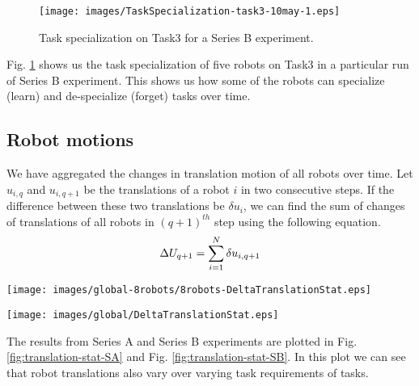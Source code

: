 \begin{figure}
\centering
\texttt{[image: images/TaskSpecialization-task3-10may-1.eps]}
\caption{Task specialization on Task3 for a Series B experiment.}
\label{fig:k-single-task-SB} 
\end{figure}
Fig. \ref{fig:k-single-task-SB} shows us the task specialization of five robots on Task3 in a particular run of Series B experiment. This shows us how some of the robots can specialize (learn) and de-specialize (forget) tasks over time.
\subsection*{Robot motions}
We have aggregated the changes in translation motion of all robots over time. Let $u_{i,q}$ and $u_{i,q+1}$ be the translations of a robot $i$ in two consecutive steps. If the difference between these two translations be $\delta u_{i}$, we can find the sum of changes of translations of all robots in $(q+1)^{th}$ step using the following equation.
\begin{equation}
\small 
\Delta U_{q+1} = \sum_{i=1}^{N} \delta u_{i, q+1} 
\label{eqn:Delta-Tr}
\end{equation}
\begin{figure*}
\centering
\texttt{[image: images/global-8robots/8robots-DeltaTranslationStat.eps]}
\caption{\small Sum of the translations of robots in Series A experiments}
\label{fig:translation-stat-SA} %
\centering
\texttt{[image: images/global/DeltaTranslationStat.eps]}
\caption{\small Sum of the translations of robots in Series B experiments}
\label{fig:translation-stat-SB} %
\end{figure*}
The results from Series A and Series B experiments are plotted in Fig. \ref{fig:translation-stat-SA} and Fig. \ref{fig:translation-stat-SB}. In this plot we can see that robot translations also vary over varying task requirements of tasks.
